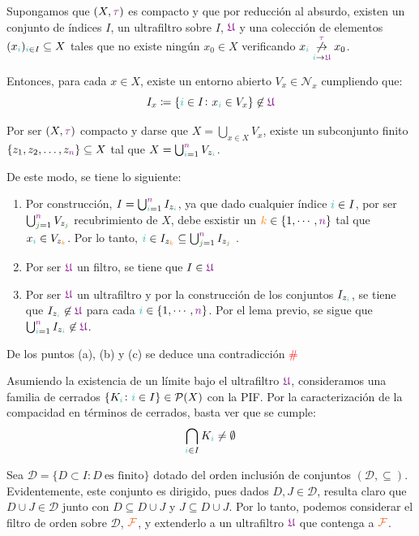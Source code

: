 \documentclass[titlepage,11pt,a4paper]{book}
\newcommand{\filt}{\ensuremath{\textcolor{Orange}{\mathcal{F}}}}
\newcommand{\ultf}{\ensuremath{\textcolor{Plum}{\mathfrak{U}}}}
\newcommand{\ii}{\ensuremath{\textcolor{TealBlue}{i}}}
\newcommand{\jj}{\ensuremath{\textcolor{OliveGreen}{j}}}
\newcommand{\nn}{\ensuremath{\textcolor{Plum}{n}}}
\newcommand{\taut}{\textcolor{Fuchsia}{\tau}}
\newcommand{\kk}{\textcolor{orange}{k}}
\newcommand{\borde}[1]{%
  \begingroup
  \setlength{\fboxsep}{2.5pt}%
  \setlength{\fboxrule}{1pt}%
  \textcolor{black}{\fbox{\normalcolor\ensuremath{#1}}}%
  \hspace{4pt}%
  \vspace{0.5 pt}
  \endgroup
}
\begin{document}
    \begin{dem}
    \borde{(1) \implies (2)} Supongamos que $(X, \taut)$ es compacto y que por reducción al absurdo, existen un conjunto de índices $I$, un ultrafiltro sobre $I$, $\ultf$ y una colección de elementos $(x_{\ii})_{\ii \in I} \subseteq X$ tales que no existe ningún $x_0 \in X$ verificando $x_{\ii} \underset{\ii \to \ultf}{\overset{\taut}{\not \to}} x_{0}$.

    \smallskip
    Entonces, para cada $x \in X$, existe un entorno abierto $V_{x} \in \mathcal{N}_{x}$ cumpliendo que:
    \[
    I_{x} \coloneq \{\ii \in I \colon x_{\ii} \in V_{x}\} \not \in \ultf
    \]

    \smallskip
    Por ser $(X, \taut)$ compacto y darse que $X = \bigcup_{x \in X} V_x$, existe un subconjunto finito $\{z_1, z_2, \ldots, z_{\nn}\} \subseteq X$ tal que $X = \bigcup_{\ii=1}^{\nn} V_{z_{\ii}}$.
    
    \smallskip
    De este modo, se tiene lo siguiente:
    \begin{enumerate}
        \item[(a)] Por construcción, $I = \bigcup_{\ii = 1}^{\nn} I_{z_{\ii}}$, ya que dado cualquier índice $\ii \in I$, por ser $\bigcup_{\jj =1}^{\nn} V_{z_{\jj}}$ recubrimiento de $X$, debe esxistir un $\kk \in \{1, \cdots, \nn\}$ tal que $x_{\ii} \in V_{z_{\kk}}$.
        Por lo tanto, $\ii \in I_{z_{\kk}} \subseteq \bigcup_{\jj = 1}^{\nn} I_{z_{\jj}}$ .
        \item[(b)] Por ser $\ultf$ un filtro, se tiene que $I \in \ultf$
        \item[(c)] Por ser $\ultf$ un ultrafiltro y por la construcción de los conjuntos $I_{z_{\ii}}$, se tiene que $I_{z_{\ii}} \not \in \ultf$ para cada $\ii \in \{1, \cdots, \nn\}$. Por el lema previo, se sigue que $\bigcup_{\ii = 1}^{\nn} I_{z_{\ii}} \not \in \ultf$. 
    \end{enumerate}
    
    \medskip
    De los puntos (a), (b) y (c) se deduce una contradicción \textcolor{red}{\#}


    \medskip
    \borde{(2) \implies (1)} Asumiendo la existencia de un límite bajo el ultrafiltro $\ultf$, consideramos una familia de cerrados $\{K_{\ii} \colon \ii \in I\} \in \mathcal{P}(X)$ con la PIF. Por la caracterización de la compacidad en términos de cerrados, basta ver que se cumple:
     \[
     \bigcap_{\ii \in I} K_{\ii} \neq \emptyset
     \]

     \medskip
     Sea $\mathcal{D} = \{D \subset I : D \ \text{es finito}\}$ dotado del orden inclusión de conjuntos $(\mathcal{D}, \subseteq)$. Evidentemente, este conjunto es dirigido, pues dados $D, J \in \mathcal{D}$, resulta claro que $D \cup J \in \mathcal D$ junto con $D \subseteq D \cup J$ y $J \subseteq D \cup J$. Por lo tanto, podemos considerar el filtro de orden sobre $\mathcal{D}$, $\filt$, y extenderlo a un ultrafiltro $\ultf$ que contenga a $\filt$.


\end{dem}
\end{document}
